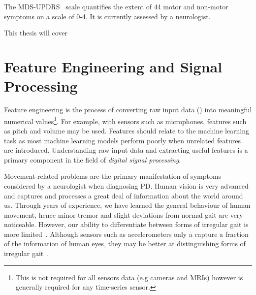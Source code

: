 \documentclass[12pt, twoside]{book}
\renewcommand\emph[1]{\textit{\color{USred}{#1}}}
\begin{document}
\begin{highlight}[UPDRS]
The MDS-UPDRS~\cite{updrs} scale quantifies the extent of 44 motor and non-motor symptoms on a scale of 0-4. It is currently assessed by a neurologist.
\end{highlight}




This thesis will cover 


\section{Feature Engineering and Signal Processing}
\label{featureengineeringsigprocs}
Feature engineering is the process of converting raw input data (\emph{signals}) into meaningful numerical values\footnote{This is not required for all sensors data (e.g cameras and MRIs) however is generally required for any time-series sensor.}. For example, with sensors such as microphones, features such as pitch and volume may be used. Features should relate to the machine learning task as most machine learning models perform poorly when unrelated features are introduced. Understanding raw input data and extracting useful features is a primary component in the field of \textit{digital signal processing}. 

Movement-related problems are the primary manifestation of symptoms considered by a neurologist when diagnosing PD. Human vision is very advanced and captures and processes a great deal of information about the world around us. Through years of experience, we have learned the general behaviour of human movement, hence minor tremor and slight deviations from normal gait are very noticeable. However, our ability to differentiate between forms of irregular gait is more limited~\cite{parkinsonismdifferential1}. Although sensors such as accelerometers only a capture a fraction of the information of human eyes, they may be better at distinguishing forms of irregular gait~\cite{parkinsonismdifferential2}.
\end{document}
